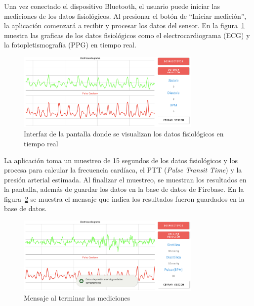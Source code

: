     Una vez conectado el dispositivo Bluetooth, el usuario puede iniciar las mediciones de los datos fisiológicos. Al presionar el botón de ``Iniciar medición'', la aplicación comenzará a recibir y procesar los datos del sensor. En la figura~\ref{fig:Android_Grafica} muestra las graficas de los datos fisiológicos como el electrocardiograma (ECG) y la fotopletismografía (PPG) en tiempo real.

    \begin{figure}[H]
        \centering
        \includegraphics[width=0.8\textwidth]{img/Resultados/android_grafica.png}
        \caption[Interfaz de la pantalla donde se visualizan los datos fisiológicos en tiempo real.]{Interfaz de la pantalla donde se visualizan los datos fisiológicos en tiempo real\footnotemark}
        \label{fig:Android_Grafica}
    \end{figure}

    La aplicación toma un muestreo de 15 segundos de los datos fisiológicos y los procesa para calcular la frecuencia cardíaca, el PTT (\textit{Pulse Transit Time}) y la presión arterial estimada. Al finalizar el muestreo, se muestran los resultados en la pantalla, además de guardar los datos en la base de datos de Firebase. En la figura~\ref{fig:Android_GraficaResultados} se muestra el mensaje que indica los resultados fueron guardados en la base de datos.

    \begin{figure}[H]
        \centering
        \includegraphics[width=0.8\textwidth]{img/Resultados/android_graficaResultados.png}
        \caption[Mensaje al terminar las mediciones.]{Mensaje al terminar las mediciones\footnotemark}
        \label{fig:Android_GraficaResultados}
    \end{figure}

